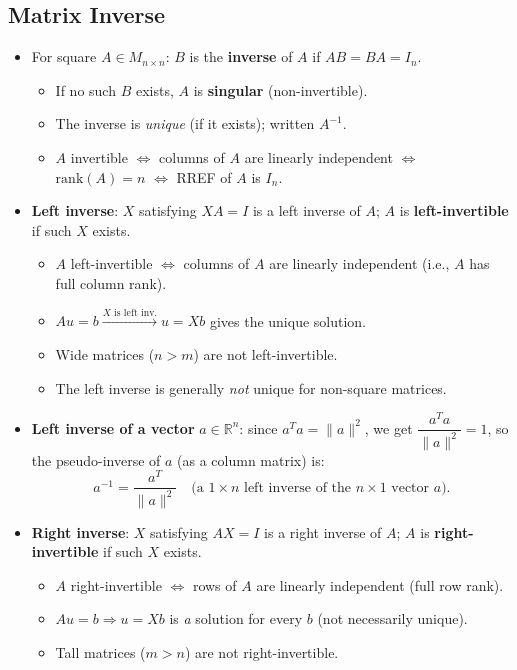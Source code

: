 \documentclass[hidelinks]{article}
\begin{document}
\subsection{Matrix Inverse}
\begin{itemize}
    \item For square $A\in M_{n\times n}$: $B$ is the \textbf{inverse} of $A$ if $AB = BA = I_n$.
    \begin{itemize}
        \item If no such $B$ exists, $A$ is \textbf{singular} (non-invertible).
        \item The inverse is \emph{unique} (if it exists); written $A^{-1}$.
        \item $A$ invertible $\iff$ columns of $A$ are linearly independent $\iff$ $\mathrm{rank}(A) = n$ $\iff$ RREF of $A$ is $I_n$.
    \end{itemize}
    \item \textbf{Left inverse}: $X$ satisfying $XA = I$ is a left inverse of $A$; $A$ is \textbf{left-invertible} if such $X$ exists.
    \begin{itemize}
        \item $A$ left-invertible $\iff$ columns of $A$ are linearly independent (i.e., $A$ has full column rank).
        \item $Au=b \xrightarrow{X \text{ is left inv.}} u = Xb$ gives the unique solution.
        \item Wide matrices ($n > m$) are not left-invertible.
        \item The left inverse is generally \emph{not} unique for non-square matrices.
    \end{itemize}
    \item \textbf{Left inverse of a vector} $a\in\mathbb{R}^n$: since $a^T a = \|a\|^2$, we get $\dfrac{a^T a}{\|a\|^2} = 1$, so the pseudo-inverse of $a$ (as a column matrix) is:
    \[
        a^{-1} = \frac{a^T}{\|a\|^2} \quad \text{(a }1\times n\text{ left inverse of the }n\times 1\text{ vector }a\text{)}.
    \]
    \item \textbf{Right inverse}: $X$ satisfying $AX = I$ is a right inverse of $A$; $A$ is \textbf{right-invertible} if such $X$ exists.
    \begin{itemize}
        \item $A$ right-invertible $\iff$ rows of $A$ are linearly independent (full row rank).
        \item $Au=b \Rightarrow u=Xb$ is \emph{a} solution for every $b$ (not necessarily unique).
        \item Tall matrices ($m > n$) are not right-invertible.

\end{itemize}
\end{itemize}
\end{document}
